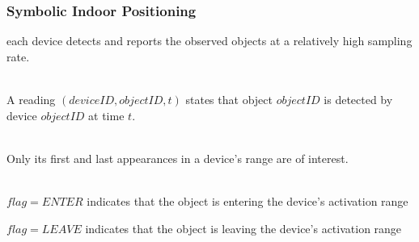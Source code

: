 \begin{frame}
\begin{columns}[c]

\end{columns}

\end{frame}


\begin{frame}
\frametitle{Symbolic Indoor Positioning}

  each device detects and reports the observed objects at a relatively high sampling rate.\\~

  A reading ${(deviceID, objectID, t)}$ states that object ${objectID}$ is detected by device ${objectID}$ at time ${t}$.\\~

  Only its first and last appearances in a device's range are of interest.\\~

  \begin{fitemize}
    \item ${flag = ENTER}$ indicates that the object is entering the device's activation range
    \item ${flag = LEAVE}$ indicates that the object is leaving the device's activation range
  \end{fitemize}

\end{frame}


